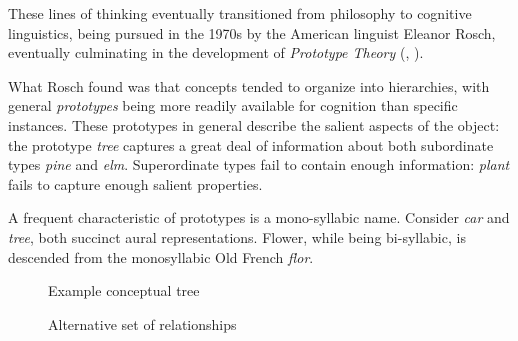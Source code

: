 \bigskip

These lines of thinking eventually transitioned from philosophy to cognitive linguistics, being pursued in the 1970s by the American linguist Eleanor Rosch, eventually culminating in the development of \textit{Prototype Theory} (\cite{rosch:1973}, \cite{rosch:1975}).

What Rosch found was that concepts tended to organize into hierarchies, with general \textit{prototypes} being more readily available for cognition than specific instances.
These prototypes in general describe the salient aspects of the object: the prototype \textit{tree} captures a great deal of information about both subordinate types \textit{pine} and \textit{elm}.
Superordinate types fail to contain enough information: \textit{plant} fails to capture enough salient properties.

A frequent characteristic of prototypes is a mono-syllabic name.
Consider \textit{car} and \textit{tree}, both succinct aural representations.
Flower, while being bi-syllabic, is descended from the monosyllabic Old French \textit{flor}.

\begin{figure}[hbt]
\begin{center}
\end{center}
\caption{Example conceptual tree}
\end{figure}


\begin{figure}[hbt]
\begin{center}
\end{center}
\caption{Alternative set of relationships}
\end{figure}

